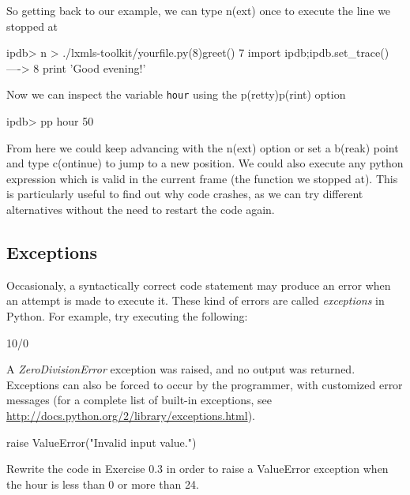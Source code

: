 
So getting back to our example, we can type n(ext) once to execute the line we stopped at

\begin{python}
ipdb> n
> ./lxmls-toolkit/yourfile.py(8)greet()
      7                 import ipdb;ipdb.set_trace()
----> 8                 print 'Good evening!' 
\end{python}

Now we can inspect the variable \texttt{hour} using the p(retty)p(rint) option

\begin{python}
ipdb> pp hour
50
\end{python}

From here we could keep advancing with the n(ext) option or set a b(reak) point and type c(ontinue) to jump to a new position. We could also execute any python expression which is valid in the current frame (the function we stopped at). This is particularly useful to find out why code crashes, as we can try different alternatives without the need to restart the code again.

\subsection{Exceptions}

Occasionaly, a syntactically correct code statement may produce an error when an attempt is made to execute it. These kind of errors are called \textit{exceptions} in Python. For example, try executing the following:

\begin{python}
10/0
\end{python}

A \textit{ZeroDivisionError} exception was raised, and no output was returned. Exceptions can also be forced to occur by the programmer, with customized error messages (for a complete list of built-in exceptions, see \url{http://docs.python.org/2/library/exceptions.html}).

\begin{python}
raise ValueError("Invalid input value.")
\end{python}

\begin{exercise}
Rewrite the code in Exercise 0.3 in order to raise a ValueError exception when the hour is less than 0 or more than 24.
\end{exercise}

